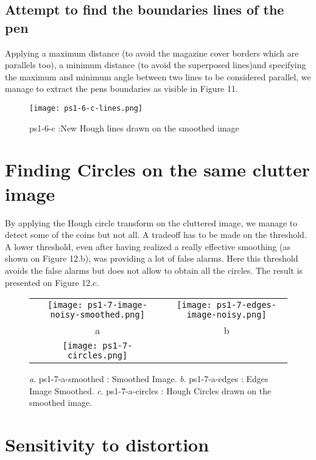 \documentclass[a4paper,11pt]{article}
\begin{document}
\subsection{Attempt to find the boundaries lines of the pen}


Applying a maximum distance (to avoid the magazine cover borders which are parallels too), a minimum distance (to avoid the superposed lines)and specifying the maximum and minimum angle between two lines to be considered parallel, we manage to extract the pens boundaries as visible in Figure 11.

\begin{figure}[H]
\centering
\texttt{[image: ps1-6-c-lines.png]}
 \caption{ps1-6-c :New Hough lines drawn on the smoothed image}
\label{ps1-6-c}
\end{figure}

\section{Finding Circles on the same clutter image}


By applying the Hough circle transform on the cluttered image, we manage to detect some of the coins but not all. A tradeoff has to be made on the threshold. A lower threshold, even after having realized a really effective smoothing (as shown on Figure 12.b), was providing a lot of false alarms. Here this threshold avoids the false alarms but does not allow to obtain all the circles.
The result is presented on Figure 12.c.

 \begin{figure}[H]
\begin{center}
\begin{tabular}{cc}
\texttt{[image: ps1-7-image-noisy-smoothed.png]}&
\texttt{[image: ps1-7-edges-image-noisy.png]}\\
	a&b\\
\texttt{[image: ps1-7-circles.png]}\\	
\end{tabular}
\end{center}
 \caption{
\textit{a}. ps1-7-a-smoothed : Smoothed Image.  \textit{b}. ps1-7-a-edges : Edges Image Smoothed. 
\textit{c}. ps1-7-a-circles :  Hough Circles drawn on the smoothed image.}
\label{ps1-7}
\end{figure}

\section{Sensitivity to distortion}
\end{document}
